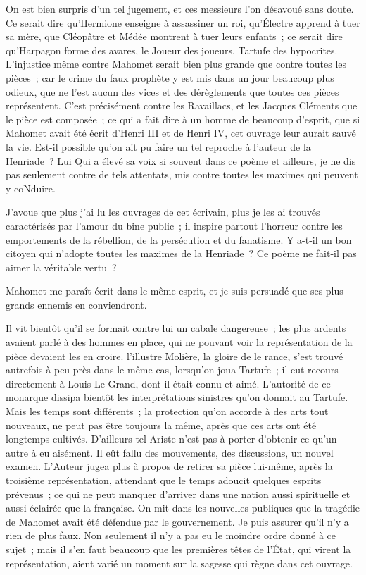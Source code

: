 \documentclass[french,twoside]{book} %
\begin{document}
On est bien surpris d’un tel jugement, et ces messieurs l’on désavoué sans doute. Ce serait dire qu’Hermione enseigne à assassiner un roi, qu’Électre apprend à tuer sa mère, que Cléopâtre et Médée montrent à tuer leurs enfants ; ce serait dire qu’Harpagon forme des avares, le Joueur des joueurs, Tartufe des hypocrites. L’injustice même contre Mahomet serait bien plus grande que contre toutes les pièces ; car le crime du faux prophète y est mis dans un jour beaucoup plus odieux, que ne l’est aucun des vices et des dérèglements que toutes ces pièces représentent. C’est précisément contre les Ravaillacs, et les Jacques Cléments que le pièce est composée ; ce qui a fait dire à un homme de beaucoup d’esprit, que si Mahomet avait été écrit d’Henri III et de Henri IV, cet ouvrage leur aurait sauvé la vie. Est-il possible qu’on ait pu faire un tel reproche à l’auteur de la Henriade ? Lui Qui a élevé sa voix si souvent dans ce poème et ailleurs, je ne dis pas seulement contre de tels attentats, mis contre toutes les maximes qui peuvent y coNduire.\par
J’avoue que plus j’ai lu les ouvrages de cet écrivain, plus je les ai trouvés caractérisés par l’amour du bine public ; il inspire partout l’horreur contre les emportements de la rébellion, de la persécution et du fanatisme. Y a-t-il un bon citoyen qui n’adopte toutes les maximes de la Henriade ? Ce poème ne fait-il pas aimer la véritable vertu ?\par
Mahomet me paraît écrit dans le même esprit, et je suis persuadé que ses plus grands ennemis en conviendront.\par
Il vit bientôt qu’il se formait contre lui un cabale dangereuse ; les plus ardents avaient parlé à des hommes en place, qui ne pouvant voir la représentation de la pièce devaient les en croire. l’illustre Molière, la gloire de le rance, s’est trouvé autrefois à peu près dans le même cas, lorsqu’on joua Tartufe ; il eut recours directement à Louis Le Grand, dont il était connu et aimé. L’autorité de ce monarque dissipa bientôt les interprétations sinistres qu’on donnait au Tartufe. Mais les temps sont différents ; la protection qu’on accorde à des arts tout nouveaux, ne peut pas être toujours la même, après que ces arts ont été longtemps cultivés. D’ailleurs tel Ariste n’est pas à porter d’obtenir ce qu’un autre à eu aisément. Il eût fallu des mouvements, des discussions, un nouvel examen. L’Auteur jugea plus à propos de retirer sa pièce lui-même, après la troisième représentation, attendant que le temps adoucit quelques esprits prévenus ; ce qui ne peut manquer d’arriver dans une nation aussi spirituelle et aussi éclairée que la française. On mit dans les nouvelles publiques que la tragédie de Mahomet avait été défendue par le gouvernement. Je puis assurer qu’il n’y a rien de plus faux. Non seulement il n’y a pas eu le moindre ordre donné à ce sujet ; mais il s’en faut beaucoup que les premières têtes de l’État, qui virent la représentation, aient varié un moment sur la sagesse qui règne dans cet ouvrage.\par
\end{document}

